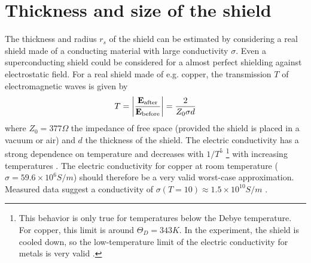 \section{Thickness and size of the shield}\label{sec:5:shield-size}
The thickness and radius $r_s$ of the shield can be estimated by considering a real shield made of a conducting material with large conductivity $\sigma$. 
Even a superconducting shield could be considered for a almost perfect shielding against electrostatic field.
For a real shield made of e.g. copper, the transmission $T$ of electromagnetic waves is given by \cite{Vandenbosch_2022}
\begin{equation}
  T = \abs{\frac{\vec{E}_\mathrm{after}}{\vec{E}_\mathrm{before}}} = \frac{2}{Z_0 \sigma d}
\end{equation}
where $Z_0 = 377\si{\Omega}$ the impedance of free space (provided the shield is placed in a vacuum or air) and $d$ the thickness of the shield.
The electric conductivity has a strong dependence on temperature and decreases with $1/T^5$ \footnote{This behavior is only true for temperatures below the Debye temperature. For copper, this limit is around $\Theta_D = 343\si{K}$. In the experiment, the shield is cooled down, so the low-temperature limit of the electric conductivity for metals is very valid \cite{Berman_1952}.} with increasing temperatures \cite[p. 284-286]{Gross_2018}. The electric conductivity for copper at room temperature ($\sigma = 59.6\times 10^6 \si{S/m}$) should therefore be a very valid worst-case approximation. 
Measured data suggest a conductivity of $\sigma(T = 10) \approx 1.5\times 10^{10}\si{S/m}$ \cite{Berman_1952}.

